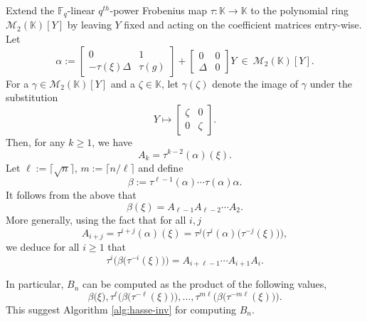 \documentclass{article}
\theoremstyle{plain}
\theoremstyle{definition}
\def\F{\ensuremath{\mathbb{F}}}
\def\K{\ensuremath{\mathbb{K}}}
\begin{document}
Extend the $\F_q$-linear $q^{th}$-power Frobenius map $\tau: \K \to \K$ to the polynomial ring $\mathscr{M}_2(\K)[Y]$ by leaving $Y$ fixed and acting on the 
coefficient matrices entry-wise.
Let
\[
\alpha := 
\begin{bmatrix}
0 & 1 \\
-\tau(\xi)\Delta & \tau(g)
\end{bmatrix}
+
\begin{bmatrix}
0 & 0 \\
\Delta & 0
\end{bmatrix} Y ~ \in ~ \mathscr{M}_2(\K)[Y].
\]
For a $\gamma \in \mathscr{M}_2(\K)[Y]$ and a $\zeta \in \K$, let $\gamma(\zeta)$ denote the image of $\gamma$ under the substitution \[Y \longmapsto \begin{bmatrix}
\zeta & 0 \\
0 & \zeta
\end{bmatrix}.\]
Then, for any $k \ge 1$, we have $$A_k = \tau^{k - 2}(\alpha)(\xi).$$
Let $\ell := \lceil \sqrt{n} \rceil$, $m := \lceil n / \ell \rceil$ and
define %
\[\beta := \tau^{\ell-1}(\alpha) \cdots \tau(\alpha) \alpha.\]
It follows from the above that 
\[\beta(\xi) = A_{\ell-1}A_{\ell - 2} \cdots A_2.\]
More generally, using the fact that for all $i, j$
\[A_{i + j} = \tau^{i + j}(\alpha)(\xi) = \tau^j\Big(\tau^i(\alpha)\big( \tau^{-j}(\xi)\big)\Big),\]
we deduce for all $i \ge 1$ that 
\[\tau^{i}\Big(\beta \big( \tau^{-i}(\xi)\big) \Big) = A_{i + \ell-1} \cdots A_{i + 1}A_i.\]

In particular, $B_n$ can be computed as the product of the following values, 
\[
\beta \big(\xi\big), \tau^{\ell}\Big(\beta \big( \tau^{-\ell}(\xi)\big) \Big), \dots, 
\tau^{m \ell}\Big(\beta \big( \tau^{-m \ell}(\xi)\big) \Big).
\]
This suggest Algorithm \ref{alg:hasse-inv} for computing $B_n$.
\end{document}
